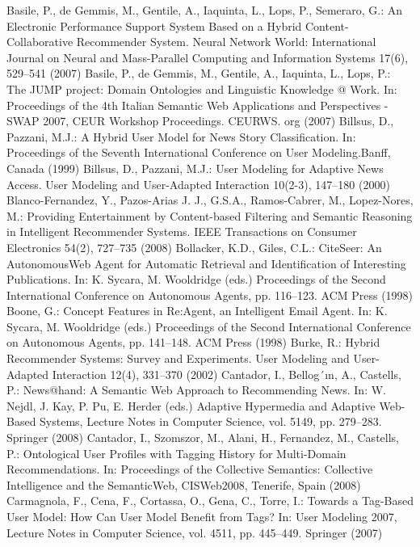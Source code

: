 \begin{thebibliography}{99}
Basile, P., de Gemmis, M., Gentile, A., Iaquinta, L., Lops, P., Semeraro, G.: An Electronic Performance Support System Based on a Hybrid Content-Collaborative Recommender System. Neural Network World: International Journal on Neural and Mass-Parallel Computing and Information Systems 17(6), 529–541 (2007)
Basile, P., de Gemmis, M., Gentile, A., Iaquinta, L., Lops, P.: The JUMP project: Domain Ontologies and Linguistic Knowledge @ Work. In: Proceedings of the 4th Italian Semantic Web Applications and Perspectives - SWAP 2007, CEUR Workshop Proceedings. CEURWS. org (2007)
Billsus, D., Pazzani, M.J.: A Hybrid User Model for News Story Classification. In: Proceedings of the Seventh International Conference on User Modeling.Banff, Canada (1999)
Billsus, D., Pazzani, M.J.: User Modeling for Adaptive News Access. User Modeling and User-Adapted Interaction 10(2-3), 147–180 (2000)
Blanco-Fernandez, Y., Pazos-Arias J. J., G.S.A., Ramos-Cabrer, M., Lopez-Nores, M.: Providing Entertainment by Content-based Filtering and Semantic Reasoning in Intelligent Recommender Systems. IEEE Transactions on Consumer Electronics 54(2), 727–735 (2008)
Bollacker, K.D., Giles, C.L.: CiteSeer: An AutonomousWeb Agent for Automatic Retrieval and Identification of Interesting Publications. In: K. Sycara, M. Wooldridge (eds.) Proceedings of the Second International Conference on Autonomous Agents, pp. 116–123. ACM Press (1998)
Boone, G.: Concept Features in Re:Agent, an Intelligent Email Agent. In: K. Sycara, M. Wooldridge (eds.) Proceedings of the Second International Conference on Autonomous Agents, pp. 141–148. ACM Press (1998)
Burke, R.: Hybrid Recommender Systems: Survey and Experiments. User Modeling and User-Adapted Interaction 12(4), 331–370 (2002)
Cantador, I., Bellog´ın, A., Castells, P.: News@hand: A Semantic Web Approach to Recommending News. In: W. Nejdl, J. Kay, P. Pu, E. Herder (eds.) Adaptive Hypermedia and Adaptive Web-Based Systems, Lecture Notes in Computer Science, vol. 5149, pp. 279–283. Springer (2008)
Cantador, I., Szomszor, M., Alani, H., Fernandez, M., Castells, P.: Ontological User Profiles with Tagging History for Multi-Domain Recommendations. In: Proceedings of the Collective Semantics: Collective Intelligence and the SemanticWeb, CISWeb2008, Tenerife, Spain (2008)
Carmagnola, F., Cena, F., Cortassa, O., Gena, C., Torre, I.: Towards a Tag-Based User Model: How Can User Model Benefit from Tags? In: User Modeling 2007, Lecture Notes in Computer Science, vol. 4511, pp. 445–449. Springer (2007)

\end{thebibliography}
